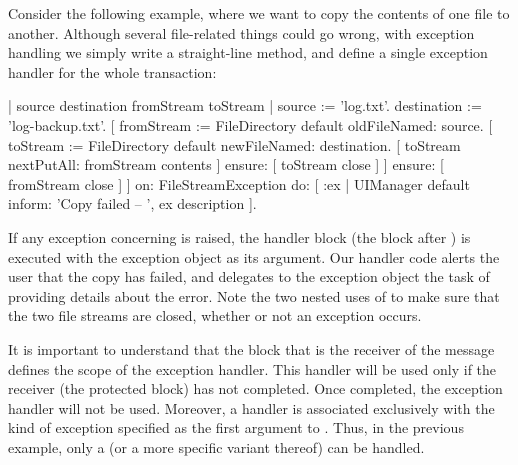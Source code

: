 \documentclass[a4paper,10pt,twoside]{book}
\begin{document}
Consider the following example, where we want to copy the contents of one file to another.
Although several file-related things could go wrong, with exception handling we simply write a straight-line method, and define a single exception handler for the whole transaction: 


\begin{code}{| source destination fromStream toStream |}
source := 'log.txt'.
destination := 'log-backup.txt'.
[	fromStream := FileDirectory default oldFileNamed: source.
	[	toStream := FileDirectory default newFileNamed: destination.
		[ toStream nextPutAll: fromStream contents ]
			ensure: [ toStream close ] ]
		ensure: [ fromStream close ] ]
	on: FileStreamException
	do: [ :ex | UIManager default inform: 'Copy failed -- ', ex description ].
\end{code}

If any exception concerning  is raised, the handler block (the block after ) is executed with the exception object as its argument.
Our handler code alerts the user that the copy has failed, and delegates to the exception object  the task of providing details about the error.
Note the two nested uses of  to make sure that the two file streams are closed, whether or not an exception occurs.

It is important to understand  that the block that is the receiver of the message  defines the scope of the exception handler. This handler will be used only if the receiver (\ie the protected block) has not completed. Once completed, the exception handler will not be used. Moreover, a handler is associated exclusively with the kind of exception specified as the first argument to . 
Thus, in the previous example, only a  (or a more specific variant thereof) can be handled.
\end{document}

